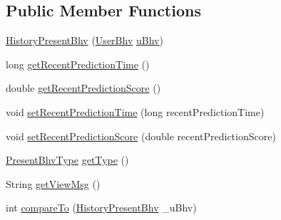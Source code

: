 \subsection*{\-Public \-Member \-Functions}
\begin{DoxyCompactItemize}
\item 
\hyperlink{classlab_1_1davidahn_1_1appshuttle_1_1view_1_1_history_present_bhv_a54e0dfc189163cb2570218711db4bef5}{\-History\-Present\-Bhv} (\hyperlink{interfacelab_1_1davidahn_1_1appshuttle_1_1collect_1_1bhv_1_1_user_bhv}{\-User\-Bhv} \hyperlink{classlab_1_1davidahn_1_1appshuttle_1_1view_1_1_viewable_user_bhv_a562684126a3e756e8ebe246c89699ba9}{u\-Bhv})
\item 
long \hyperlink{classlab_1_1davidahn_1_1appshuttle_1_1view_1_1_history_present_bhv_a427dc2c2de95e342041aa00611a802a7}{get\-Recent\-Prediction\-Time} ()
\item 
double \hyperlink{classlab_1_1davidahn_1_1appshuttle_1_1view_1_1_history_present_bhv_a63e3803599cb9e3689301e677ebda761}{get\-Recent\-Prediction\-Score} ()
\item 
void \hyperlink{classlab_1_1davidahn_1_1appshuttle_1_1view_1_1_history_present_bhv_adae39116d1163c34b3479d2f5a96a485}{set\-Recent\-Prediction\-Time} (long recent\-Prediction\-Time)
\item 
void \hyperlink{classlab_1_1davidahn_1_1appshuttle_1_1view_1_1_history_present_bhv_a13446007422a70d55d293e7e3e2fc725}{set\-Recent\-Prediction\-Score} (double recent\-Prediction\-Score)
\item 
\hyperlink{enumlab_1_1davidahn_1_1appshuttle_1_1view_1_1_present_bhv_type}{\-Present\-Bhv\-Type} \hyperlink{classlab_1_1davidahn_1_1appshuttle_1_1view_1_1_history_present_bhv_a5946bdd765ea3047788f105a7eddb6d0}{get\-Type} ()
\item 
\-String \hyperlink{classlab_1_1davidahn_1_1appshuttle_1_1view_1_1_history_present_bhv_a09890fe5f71f759a429d646a7446ccf9}{get\-View\-Msg} ()
\item 
int \hyperlink{classlab_1_1davidahn_1_1appshuttle_1_1view_1_1_history_present_bhv_a833191ff923a57b4664725b7f8438543}{compare\-To} (\hyperlink{classlab_1_1davidahn_1_1appshuttle_1_1view_1_1_history_present_bhv}{\-History\-Present\-Bhv} \-\_\-u\-Bhv)
\end{DoxyCompactItemize}
